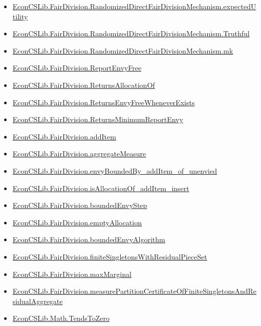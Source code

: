 \documentclass[10pt]{article}
\begin{document}
\begin{itemize}[leftmargin=1.2em]
\begin{itemize}[leftmargin=1.2em]
\item \hyperlink{library-prerequisite-2fbcf04fec3f92ea}{EconCSLib.FairDivision.RandomizedDirectFairDivisionMechanism.expectedUtility}
\item \hyperlink{library-prerequisite-9e5d932fcb0510a5}{EconCSLib.FairDivision.RandomizedDirectFairDivisionMechanism.Truthful}
\item \hyperlink{library-prerequisite-cb397ee1b5680663}{EconCSLib.FairDivision.RandomizedDirectFairDivisionMechanism.mk}
\item \hyperlink{library-prerequisite-6586219319f000e8}{EconCSLib.FairDivision.ReportEnvyFree}
\item \hyperlink{library-prerequisite-f45991cfea2e096b}{EconCSLib.FairDivision.ReturnsAllocationOf}
\item \hyperlink{library-prerequisite-ae47ac24e42983c1}{EconCSLib.FairDivision.ReturnsEnvyFreeWheneverExists}
\item \hyperlink{library-prerequisite-2d5a2084337a0aab}{EconCSLib.FairDivision.ReturnsMinimumReportEnvy}
\item \hyperlink{library-prerequisite-025e1c87f00c9e4d}{EconCSLib.FairDivision.addItem}
\item \hyperlink{library-prerequisite-38c7364194f30be2}{EconCSLib.FairDivision.aggregateMeasure}
\item \hyperlink{library-prerequisite-f21e564065d831dc}{EconCSLib.FairDivision.envyBoundedBy\_addItem\_of\_unenvied}
\item \hyperlink{library-prerequisite-8b95be66459df78a}{EconCSLib.FairDivision.isAllocationOf\_addItem\_insert}
\item \hyperlink{library-prerequisite-caa78aaef93da769}{EconCSLib.FairDivision.boundedEnvyStep}
\item \hyperlink{library-prerequisite-7f4c7bd42a409b5b}{EconCSLib.FairDivision.emptyAllocation}
\item \hyperlink{library-prerequisite-e1f8a4a63bbcc9c9}{EconCSLib.FairDivision.boundedEnvyAlgorithm}
\item \hyperlink{library-prerequisite-b6fcc5f273e8fcce}{EconCSLib.FairDivision.finiteSingletonsWithResidualPieceSet}
\item \hyperlink{library-prerequisite-4fcb26e376d58384}{EconCSLib.FairDivision.maxMarginal}
\item \hyperlink{library-prerequisite-fce3701d9675ed6a}{EconCSLib.FairDivision.measurePartitionCertificateOfFiniteSingletonsAndResidualAggregate}
\item \hyperlink{library-prerequisite-0d847b93822bc6c4}{EconCSLib.Math.TendsToZero}

\end{itemize}
\end{itemize}
\end{document}
